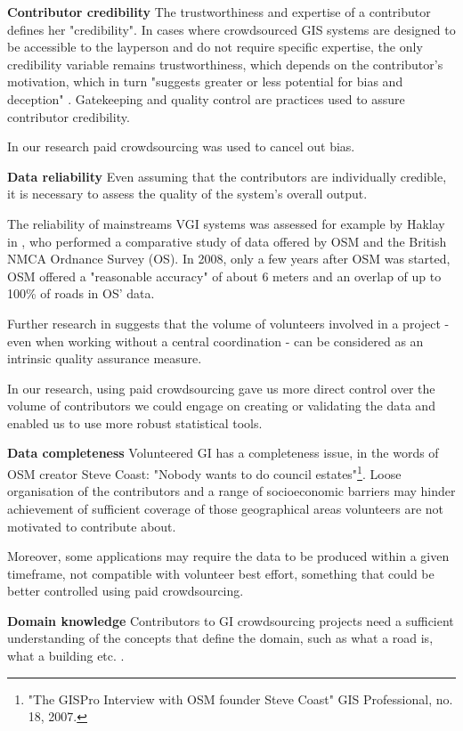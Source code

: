 \textbf{Contributor credibility} The trustworthiness and expertise of a contributor defines her "credibility". In cases where crowdsourced GIS systems are designed to be accessible to the layperson and do not require specific expertise, the only credibility variable remains trustworthiness, which depends on the contributor's motivation, which in turn "suggests greater or less potential for bias and deception" \cite{Flanagin:2008ck}. Gatekeeping and quality control are practices used to assure contributor credibility. 

In our research paid crowdsourcing was used to cancel out bias.

\textbf{Data reliability} Even assuming that the contributors are individually credible, it is necessary to assess the quality of the system's overall output. 

The reliability of mainstreams VGI systems was assessed for example by Haklay in \cite{Haklay:2010vs}, who performed a comparative study of data offered by OSM and the British NMCA Ordnance Survey (OS). In 2008, only a few years after OSM was started, OSM offered a "reasonable accuracy" of about 6 meters and an overlap of up to 100\% of roads in OS' data. 

Further research in \cite{Haklay:2010wf} suggests that the volume of volunteers involved in a project - even when working without a central coordination - can be considered as an intrinsic quality assurance measure.

In our research, using paid crowdsourcing gave us more direct control over the volume of contributors we could engage on creating or validating the data and enabled us to use more robust statistical tools.

\textbf{Data completeness} Volunteered GI has a completeness issue, in the words of OSM creator Steve Coast: "Nobody wants to do council estates"\footnote{"The GISPro Interview with OSM founder Steve Coast" GIS Professional, no. 18, 2007.}. Loose organisation of the contributors and a range of socioeconomic barriers \cite{Haklay:2010vs} may hinder achievement of sufficient coverage of those geographical areas volunteers are not motivated to contribute about.

Moreover, some applications may require the data to be produced within a given timeframe, not compatible with volunteer best effort, something that could be better controlled using paid crowdsourcing.

\textbf{Domain knowledge} Contributors to GI crowdsourcing projects need a sufficient understanding of the concepts that define the domain, such as what a road is, what a building etc. \cite{Ballatore:2015kg}. 

